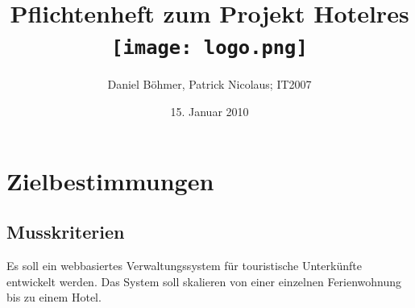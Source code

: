 \documentclass[a4paper,oneside]{scrreprt}
\date{15. Januar 2010}
\author{Daniel Böhmer, Patrick Nicolaus; IT2007}
\title{Pflichtenheft zum Projekt Hotelres \\ \vspace{2 cm} \texttt{[image: logo.png]}}
\begin{document}
\maketitle{}

\tableofcontents{}



\chapter{Zielbestimmungen}

\section{Musskriterien}

Es soll ein webbasiertes Verwaltungssystem für touristische Unterkünfte entwickelt werden. Das System soll skalieren von einer einzelnen Ferienwohnung bis zu einem Hotel.
\end{document}
